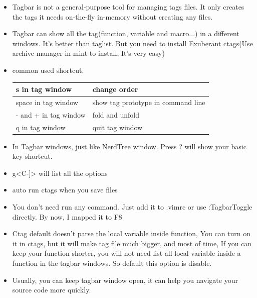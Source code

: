 \documentclass[a4paper,11pt,twoside]{book}
\begin{document}
\begin{itemize}

\item Tagbar is not a general-purpose tool for managing tags files. It only creates the tags it needs on-the-fly in-memory without creating any files. 

\item Tagbar can show all the tag(function, variable and macro...) in a different windows. It's better than taglist. But you need to install Exuberant ctags(Use archive manager in mint to install, It's very easy)

\item common used shortcut.	\\	
\begin{tabular}{|p{}|p{}|}
\hline 
s in tag window & change order \\ 

\hline 
space in tag window & show tag prototype in command line  \\ 

\hline 
- and + in tag window & fold and unfold \\ 

\hline 
q in tag window & quit tag window \\ 

\hline 
\end{tabular}

\item In Tagbar windows, just like NerdTree window. Press ? will show your basic key shortcut. 
		
\item g<C-]> will list all the options
		
\item auto run ctags when you save files

\item You don't need run any command. Just add it to .vimrc or use :TagbarToggle directly. By now, I mapped it to F8

\item Ctag default doesn't parse the local variable inside function, You can turn on it in ctags, but it will make tag file much bigger, and most of time, If you can keep your function shorter, you will not need list all local variable inside a function in the tagbar windows. So default this option is disable. 

\item Usually, you can keep tagbar window open, it can help you navigate your source code more quickly. 
\end{itemize}
\end{document}
